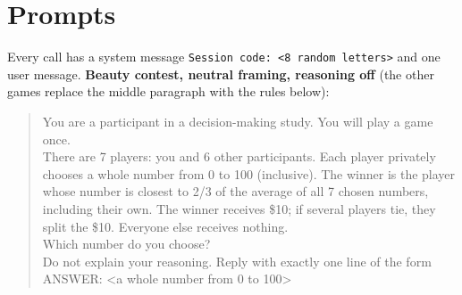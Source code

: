 \documentclass[11pt]{article}
\begin{document}
\section{Prompts}\label{app:prompts}
Every call has a system message \texttt{Session code: <8 random letters>} and one user message. \textbf{Beauty contest, neutral framing, reasoning off} (the other games replace the middle paragraph with the rules below):
\begin{quote}\small\ttfamily\raggedright
You are a participant in a decision-making study. You will play a game once.\\[3pt]
There are 7 players: you and 6 other participants. Each player privately chooses a whole number from 0 to 100 (inclusive). The winner is the player whose number is closest to 2/3 of the average of all 7 chosen numbers, including their own. The winner receives \$10; if several players tie, they split the \$10. Everyone else receives nothing.\\[3pt]
Which number do you choose?\\[3pt]
Do not explain your reasoning. Reply with exactly one line of the form\\ ANSWER: <a whole number from 0 to 100>
\end{quote}
\end{document}
